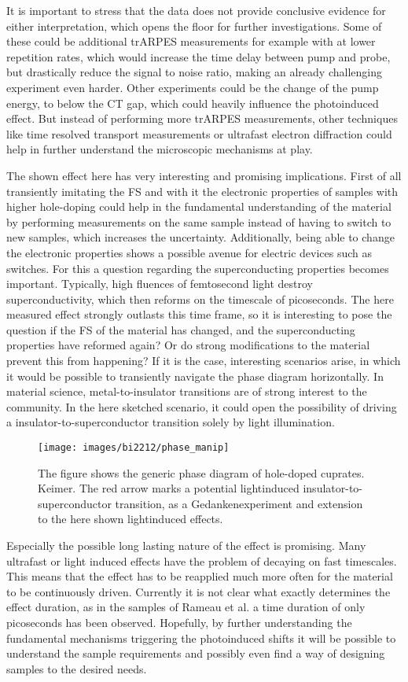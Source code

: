 It is important to stress that the data does not provide conclusive evidence for either interpretation, which opens the floor for further investigations.
Some of these could be additional trARPES measurements for example with at lower repetition rates, which would increase the time delay between pump and probe, but drastically reduce the signal to noise ratio, making an already challenging experiment even harder.
Other experiments could be the change of the pump energy, to below the CT gap, which could heavily influence the photoinduced effect.
But instead of performing more trARPES measurements, other techniques like time resolved transport measurements or ultrafast electron diffraction could help in further understand the microscopic mechanisms at play.

The shown effect here has very interesting and promising implications.
First of all transiently imitating the FS and with it the electronic properties of samples with higher hole-doping could help in the fundamental understanding of the material by performing measurements on the same sample instead of having to switch to new samples, which increases the uncertainty.
Additionally, being able to change the electronic properties shows a possible avenue for electric devices such as switches.
For this a question regarding the superconducting properties becomes important.
Typically, high fluences of femtosecond light destroy superconductivity, which then reforms on the timescale of picoseconds.
The here measured effect strongly outlasts this time frame, so it is interesting to pose the question if the FS of the material has changed, and the superconducting properties have reformed again?
Or do strong modifications to the material prevent this from happening?
If it is the case, interesting scenarios arise, in which it would be possible to transiently navigate the phase diagram horizontally.
In material science, metal-to-insulator transitions are of strong interest to the community.
In the here sketched scenario, it could open the possibility of driving a insulator-to-superconductor transition solely by light illumination.

\begin{figure}
	\centering
	\texttt{[image: images/bi2212/phase\_manip]}
	\caption{The figure shows the generic phase diagram of hole-doped cuprates. \cite{} Keimer. The red arrow marks a potential lightinduced insulator-to-superconductor transition, as a Gedankenexperiment and extension to the here shown lightinduced effects.}
	\label{fig:phasemanip}
\end{figure}

Especially the possible long lasting nature of the effect is promising.
Many ultrafast or light induced effects have the problem of decaying on fast timescales.
This means that the effect has to be reapplied much more often for the material to be continuously driven.
Currently it is not clear what exactly determines the effect duration, as in the samples of Rameau et al. \cite{} a time duration of only picoseconds has been observed.
Hopefully, by further understanding the fundamental mechanisms triggering the photoinduced shifts it will be possible to understand the sample requirements and possibly even find a way of designing samples to the desired needs.
